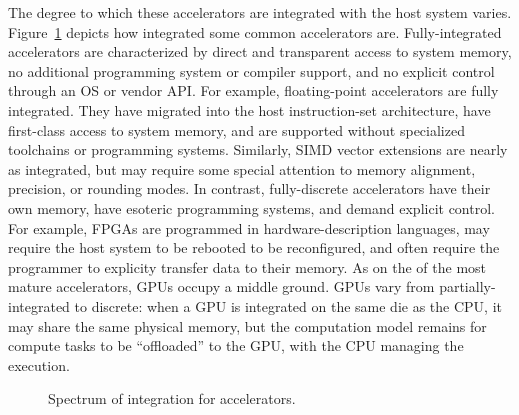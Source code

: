 The degree to which these accelerators are integrated with the host system varies.
Figure~\ref{fig:integration-spectrum} depicts how integrated some common accelerators are.
Fully-integrated accelerators are characterized by direct and transparent access to system memory, no additional programming system or compiler support, and no explicit control through an OS or vendor API.
For example, floating-point accelerators are fully integrated.
They have migrated into the host instruction-set architecture, have first-class access to system memory, and are supported without specialized toolchains or programming systems.
Similarly, SIMD vector extensions are nearly as integrated, but may require some special attention to memory alignment, precision, or rounding modes.
In contrast, fully-discrete accelerators have their own memory, have esoteric programming systems, and demand explicit control.
For example, FPGAs are programmed in hardware-description languages, may require the host system to be rebooted to be reconfigured, and often require the programmer to explicity transfer data to their memory.
As on the of the most mature accelerators, GPUs occupy a middle ground.
GPUs vary from partially-integrated to discrete: when a GPU is integrated on the same die as the CPU, it may share the same physical memory, but the computation model remains for compute tasks to be ``offloaded'' to the GPU, with the CPU managing the execution.

\begin{figure}
    \centering
    \caption{Spectrum of integration for accelerators.}
    \label{fig:integration-spectrum}
\end{figure}

